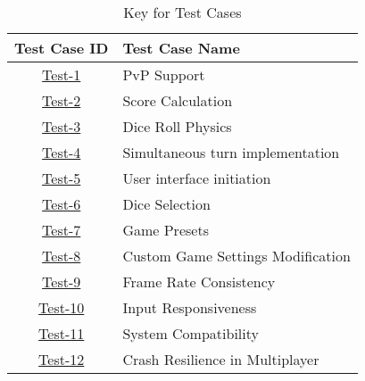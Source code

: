 \documentclass[12pt, titlepage]{article}
\begin{document}
\begin{table}[H]
    \centering
    \caption{Key for Test Cases}
    \begin{tabular}{|c|l|}
        \hline
        \textbf{Test Case ID} & \textbf{Test Case Name} \\
        \hline
        \hyperref[test-1]{Test-1} & PvP Support \\
        \hyperref[test-2]{Test-2} & Score Calculation \\
        \hyperref[test-3]{Test-3} & Dice Roll Physics \\
        \hyperref[test-4]{Test-4} & Simultaneous turn implementation \\
        \hyperref[test-5]{Test-5} & User interface initiation \\
        \hyperref[test-6]{Test-6} & Dice Selection \\
        \hyperref[test-7]{Test-7} & Game Presets \\
        \hyperref[test-8]{Test-8} & Custom Game Settings Modification \\
        \hyperref[test-9]{Test-9} & Frame Rate Consistency \\
        \hyperref[test-10]{Test-10} & Input Responsiveness \\
        \hyperref[test-11]{Test-11} & System Compatibility \\
        \hyperref[test-12]{Test-12} & Crash Resilience in Multiplayer \\
        \hline
    \end{tabular}
    \label{tab:traceability_key1}
\end{table}
\end{document}
